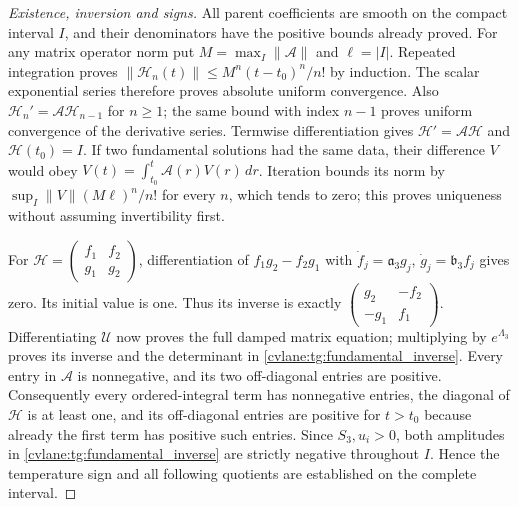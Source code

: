 \begin{proof}[Existence, inversion and signs]
All parent coefficients are smooth on the compact interval $I$, and
their denominators have the positive bounds already proved. For any
matrix operator norm put $M=\max_I\|\mathcal A\|$ and
$\ell=|I|$. Repeated integration proves
$\|\mathcal H_n(t)\|\leq M^n(t-t_0)^n/n!$ by induction.
The scalar exponential series therefore proves absolute uniform
convergence. Also
$\mathcal H_n'=\mathcal A\mathcal H_{n-1}$ for $n\geq1$;
the same bound with index $n-1$ proves uniform convergence of the
derivative series. Termwise differentiation gives
$\mathcal H'=\mathcal A\mathcal H$ and $\mathcal H(t_0)=I$.
If two fundamental solutions had the same data, their difference
$V$ would obey $V(t)=\int_{t_0}^t\mathcal A(r)V(r)\,dr$.
Iteration bounds its norm by
$\sup_I\|V\|(M\ell)^n/n!$ for every $n$, which tends to zero;
this proves uniqueness without assuming invertibility first.

For $\mathcal H=\left(\begin{smallmatrix}f_1&f_2\\g_1&g_2\end{smallmatrix}\right)$,
differentiation of $f_1g_2-f_2g_1$ with
$\dot f_j=\mathfrak a_3g_j$,
$\dot g_j=\mathfrak b_3f_j$ gives zero. Its initial value is one.
Thus its inverse is exactly
$\left(\begin{smallmatrix}g_2&-f_2\\-g_1&f_1\end{smallmatrix}\right)$.
Differentiating $\mathcal U$ now proves the full damped matrix
equation; multiplying by $e^{\Lambda_3}$ proves its inverse and
the determinant in \eqref{cvlane:tg:fundamental_inverse}.
Every entry in $\mathcal A$ is nonnegative, and its two off-diagonal
entries are positive. Consequently every ordered-integral term has
nonnegative entries, the diagonal of $\mathcal H$ is at least one,
and its off-diagonal entries are positive for $t>t_0$ because already
the first term has positive such entries. Since $S_3,u_i>0$, both
amplitudes in \eqref{cvlane:tg:fundamental_inverse} are strictly negative
throughout $I$. Hence the temperature sign and all following
quotients are established on the complete interval.
\end{proof}

